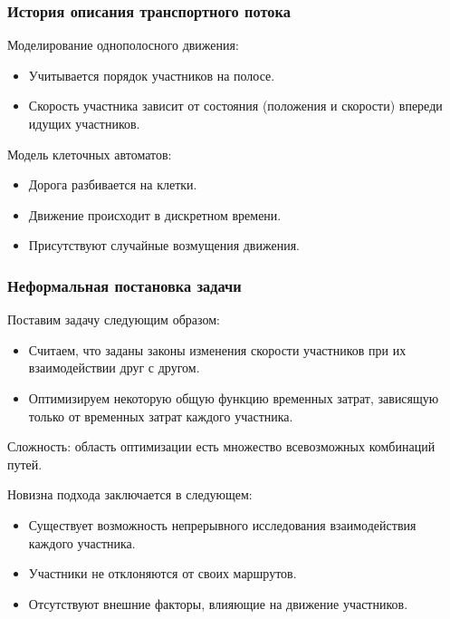 \documentclass{beamer}
\begin{document}
\begin{frame}\frametitle{История описания транспортного потока}
	Моделирование однополосного движения:
	\begin{itemize}
		\item Учитывается порядок участников на полосе.
		
		\item Скорость участника зависит от состояния (положения и скорости) впереди идущих участников.
	\end{itemize}

	\bigskip
	
	Модель клеточных автоматов:
	\begin{itemize}
		\item Дорога разбивается на клетки.
		
		\item Движение происходит в дискретном времени.
		
		\item Присутствуют случайные возмущения движения.
	\end{itemize}
\end{frame}

\begin{frame}\frametitle{Неформальная постановка задачи}
	
	Поставим задачу следующим образом:
	
	\begin{itemize}
		\item Считаем, что заданы законы изменения скорости участников при их взаимодействии друг с другом.
		
		\item Оптимизируем некоторую общую функцию временных затрат, зависящую только от временных затрат каждого участника.
	\end{itemize}
	\bigskip
	Сложность: область оптимизации есть множество всевозможных комбинаций путей.
	
	\bigskip
	
	Новизна подхода заключается в следующем:
	\begin{itemize}
		\item Существует возможность непрерывного исследования взаимодействия каждого участника.
		
		\item Участники не отклоняются от своих маршрутов.
		
		\item Отсутствуют внешние факторы, влияющие на движение участников.
	\end{itemize}

	\bigskip


\end{frame}
\end{document}

